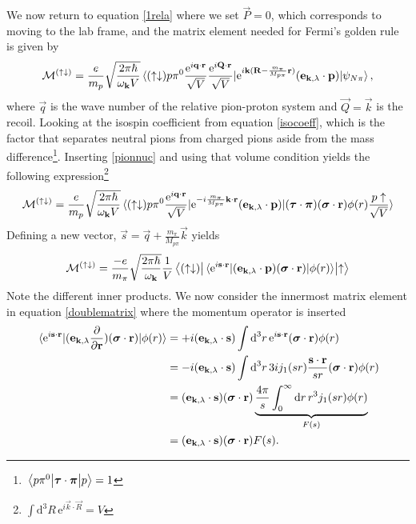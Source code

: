 We now return to equation \eqref{1rela} where we set $\vec{P}=0$, which corresponds to moving to the lab frame, and the matrix element needed for Fermi's golden rule is given by
\begin{equation}\label{MatrixSpinupdown} 
	\mathcal{M}^{(\uparrow\downarrow)} = \frac{e}{m_p} \sqrt{\frac{2\pi\hbar}{\omega_{\bm{\mathrm{k}}}V}} \mel*{(\uparrow\downarrow)p\pi^0 \frac{\text{e}^{i\bm{\mathrm{q}}\cdot \bm{\mathrm{r}}}}{\sqrt{V}}\frac{\text{e}^{i\bm{\mathrm{Q}}\cdot \bm{\mathrm{r}}}}{\sqrt{V}}}{\text{e}^{i\bm{\mathrm{k}}(\bm{\mathrm{R}}-\frac{m_\pi}{M_{p\pi}}\bm{\mathrm{r}})}(\bm{\mathrm{e}}_{\bm{\mathrm{k}},\lambda}\cdot\bm{\mathrm{p}})}{\psi_{N\pi}} ,
\end{equation}
where $\vec{q}$ is the wave number of the relative pion-proton system and $\vec{Q}=\vec{k}$ is the recoil. Looking at the isospin coefficient from equation \eqref{isocoeff}, which is the factor that separates neutral pions from charged pions aside from the mass difference\footnote{$\mel{p\pi^0}{\bm{\mathrm{\tau}}\cdot\bm{\mathrm{\pi}}}{p}=1$}. Inserting \eqref{pionnuc} and using that volume condition yields the following expression\footnote{$\int \text{d}^3R \, \text{e}^{i\vec{k}\cdot\vec{R}}=V$}
\begin{equation} \label{MatrixSpinupdown2}
	\mathcal{M}^{(\uparrow\downarrow)} = \frac{e}{m_p} \sqrt{\frac{2\pi\hbar}{\omega_{\bm{\mathrm{k}}}V}} \mel*{(\uparrow\downarrow)p\pi^0 \frac{\text{e}^{i\bm{\mathrm{q}}\cdot \bm{\mathrm{r}}}}{\sqrt{V}}}{\text{e}^{-i\frac{m_\pi}{M_{p\pi}}\bm{\mathrm{k}}\cdot\bm{\mathrm{r}}}(\bm{\mathrm{e}}_{\bm{\mathrm{k}},\lambda}\cdot\bm{\mathrm{p}})}{(\bm{\mathrm{\tau}}\cdot\bm{\mathrm{\pi}})(\bm{\mathrm{\sigma}}\cdot\bm{\mathrm{r}})\phi(r) \frac{p\uparrow}{\sqrt{V}}} 
\end{equation}
Defining a new vector, $\vec{s}=\vec{q}+\frac{m_\pi}{M_{p\pi}}\vec{k}$ yields
\begin{equation}\label{doublematrix}
	\mathcal{M}^{(\uparrow\downarrow)} = \frac{-e}{m_\pi} \sqrt{\frac{2\pi\hbar}{\omega_{\bm{\mathrm{k}}}}} \frac{1}{V} \mel{(\uparrow \downarrow)}{\mel*{\text{e}^{i\bm{\mathrm{s}}\cdot\bm{\mathrm{r}}}}{(\bm{\mathrm{e}}_{\bm{\mathrm{k}},\lambda}\cdot\bm{\mathrm{p}})(\bm{\mathrm{\sigma}}\cdot\bm{\mathrm{r}})}{\phi(r)}}{\uparrow}
\end{equation}
Note the different inner products. We now consider the innermost matrix element in equation \eqref{doublematrix} where the momentum operator is inserted
\begin{align}
	\mel*{\text{e}^{i\bm{\mathrm{s}}\cdot\bm{\mathrm{r}}}}{(\bm{\mathrm{e}}_{\bm{\mathrm{k}},\lambda}\frac{\partial}{\partial \bm{\mathrm{r}}})(\bm{\mathrm{\sigma}}\cdot \bm{\mathrm{r}})}{\phi(r)} &=+i(\bm{\mathrm{e}}_{\bm{\mathrm{k}},\lambda}\cdot \bm{\mathrm{s}}) \int \text{d}^3 r \, \text{e}^{i\bm{\mathrm{s}}\cdot\bm{\mathrm{r}}}(\bm{\mathrm{\sigma}}\cdot \bm{\mathrm{r}}) \phi(r) \\ 
	&= -i(\bm{\mathrm{e}}_{\bm{\mathrm{k}},\lambda}\cdot \bm{\mathrm{s}}) \int \text{d}^3 r \, 3 i j_1(sr) \frac{\bm{\mathrm{s}}\cdot \bm{\mathrm{r}}}{sr}(\bm{\mathrm{\sigma}}\cdot \bm{\mathrm{r}}) \phi(r)  \label{planebob}\\
	&= (\bm{\mathrm{e}}_{\bm{\mathrm{k}},\lambda}\cdot \bm{\mathrm{s}})(\bm{\mathrm{\sigma}}\cdot \bm{\mathrm{r}}) \underbrace{\frac{4\pi}{s} \int_0^\infty \text{d}r \, r^3 j_1(sr) \phi(r)}_{F(s)} \label{unitbob} \\
	&= (\bm{\mathrm{e}}_{\bm{\mathrm{k}},\lambda}\cdot \bm{\mathrm{s}})(\bm{\mathrm{\sigma}}\cdot \bm{\mathrm{r}}) F(s).
\end{align}
